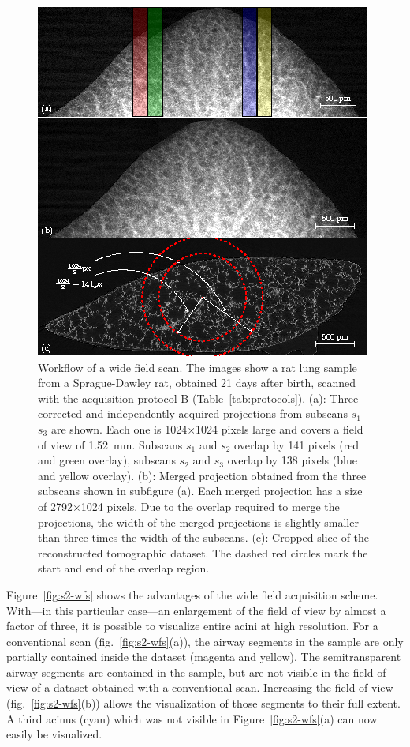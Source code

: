 \begin{figure}[p]
	\centering
	\includegraphics[width=\linewidth]{img/Haberthuer2010/Fig04-Workflow}
	\caption[Workflow of a wide field scan]{Workflow of a wide field scan. The images show a rat lung sample from a Sprague-Dawley rat, obtained 21 days after birth, scanned with the acquisition protocol B (Table~\ref{tab:protocols}). %
			(a): Three corrected and independently acquired projections from subscans $s_1$--$s_3$ are shown. Each one is 1024\(\times\)1024 pixels large and covers a field of view of \SI{1.52}{\milli\meter}. Subscans $s_1$ and $s_2$ overlap by 141 pixels (red and green overlay), subscans $s_2$ and $s_3$ overlap by 138 pixels (blue and yellow overlay). %
			(b): Merged projection obtained from the three subscans shown in subfigure (a). Each merged projection has a size of 2792\(\times\)1024 pixels. Due to the overlap required to merge the projections, the width of the merged projections is slightly smaller than three times the width of the subscans. %
			(c): Cropped slice of the reconstructed tomographic dataset. The dashed red circles mark the start and end of the overlap region.}
	\label{fig:wide-field-scan-results}
\end{figure}

Figure~\ref{fig:s2-wfs} shows the advantages of the wide field acquisition scheme. With---in this particular case---an enlargement of the field of view by almost a factor of three, it is possible to visualize entire acini at high resolution. For a conventional scan (fig.~\ref{fig:s2-wfs}(a)), the airway segments in the sample are only partially contained inside the dataset (magenta and yellow). The semitransparent airway segments are contained in the sample, but are not visible in the field of view of a dataset obtained with a conventional scan. Increasing the field of view (fig.~\ref{fig:s2-wfs}(b)) allows the visualization of those segments to their full extent. A third acinus (cyan) which was not visible in Figure~\ref{fig:s2-wfs}(a) can now easily be visualized.

